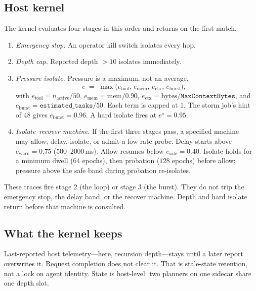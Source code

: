 \documentclass[11pt,a4paper]{article}
\begin{document}
\subsection{Host kernel}
\label{sec:kernel}

The kernel evaluates four stages in this order and returns on the first match.
\begin{enumerate}
  \item \emph{Emergency stop.} An operator kill switch isolates every hop.
  \item \emph{Depth cap.} Reported depth $>10$ isolates immediately.
  \item \emph{Pressure isolate.} Pressure is a maximum, not an average,
\begin{equation}
    e \;=\; \max\!\bigl(e_{\mathrm{tool}},\, e_{\mathrm{mem}},\, e_{\mathrm{ctx}},\, e_{\mathrm{burst}}\bigr),
    \label{eq:entropy}
\end{equation}
with $e_{\mathrm{tool}}=n_{\mathrm{active}}/50$, $e_{\mathrm{mem}}=\mathrm{mem}/0.90$, $e_{\mathrm{ctx}}=\mathrm{bytes}/\texttt{MaxContextBytes}$, and $e_{\mathrm{burst}}=\texttt{estimated\_tasks}/50$.
Each term is capped at $1$.
The storm job's hint of $48$ gives $e_{\mathrm{burst}}=0.96$.
A hard isolate fires at $e^{\star}=0.95$.
  \item \emph{Isolate--recover machine.} If the first three stages pass, a specified machine may allow, delay, isolate, or admit a low-rate probe.
Delay starts above $e_{\mathrm{warn}}=0.75$ ($500$--$2000$\,ms).
Allow resumes below $e_{\mathrm{safe}}=0.40$.
Isolate holds for a minimum dwell ($64$ epochs), then probation ($128$ epochs) before allow; pressure above the safe band during probation re-isolates.
\end{enumerate}

These traces fire stage 2 (the loop) or stage 3 (the burst).
They do not trip the emergency stop, the delay band, or the recover machine.
Depth and hard isolate return before that machine is consulted.

\subsection{What the kernel keeps}
\label{sec:state}

Last-reported host telemetry---here, recursion depth---stays until a later report overwrites it.
Request completion does not clear it.
That is stale-state retention, not a lock on agent identity.
State is host-level: two planners on one sidecar share one depth slot.
\end{document}
